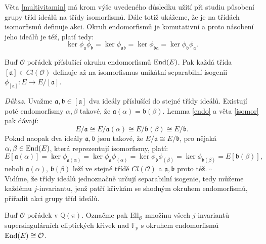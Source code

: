 \documentclass[12pt]{report}
\begin{document}
Věta \ref{multivitamin} má krom výše uvedeného důsledku užití při studiu působení grupy tříd ideálů na třídy isomorfismů. Dále totiž ukážeme, že je na třídách isomorfismů definuje akci. Okruh endomorfismů je komutativní a proto násobení jeho ideálů je též, platí tedy:
\begin{equation*}
\ker \phi_{\mathfrak{a}} \phi_{\mathfrak{b}} = \ker \phi_{\mathfrak{ab}} =\ker \phi_{\mathfrak{ba}} = \ker \phi_{\mathfrak{b}} \phi_{\mathfrak{a}}.
\end{equation*}


\begin{veta}\label{idealiso}
Buď $\mathcal{O}$ pořádek příslušící okruhu endomorfismů $\operatorname{End}(E)$. Pak každá třída $[\mathfrak{a}] \in Cl(\mathcal{O})$ definuje až na isomorfismus unikátní separabilní isogenii $\phi_{[\mathfrak{a}]} : E \longrightarrow E/[\mathfrak{a}]$.
\end{veta}
\noindent \textit{Důkaz.} Uvažme $\mathfrak{a},\mathfrak{b} \in [\mathfrak{a}]$ dva ideály příslušící do stejné třídy ideálů. Existují poté endomorfismy $\alpha,\beta$ takové, že $\mathfrak{a}(\alpha) =  \mathfrak{b}(\beta)$. Lemma \ref{endo} a věta \ref{isomor} pak dávají:
\begin{equation*}
E/\mathfrak{a} \cong E/\mathfrak{a}(\alpha)\cong E/\mathfrak{b}(\beta) \cong E/\mathfrak{b}.
\end{equation*}
Pokud naopak dva ideály $\mathfrak{a},\mathfrak{b}$ jsou takové, že $E/\mathfrak{a} \cong E/\mathfrak{b}$, pro nějaká $\alpha,\beta \in \operatorname{End}(E)$, která reprezentují isomorfismy, platí:
\begin{equation*}
E[\mathfrak{a}(\alpha)] = \ker \phi_{\mathfrak{a}(\alpha)} =  \ker \phi_{\mathfrak{a}} \phi_{(\alpha)} = \ker  \phi_{\mathfrak{b}} \phi_{(\beta)} = \ker \phi_{\mathfrak{b} (\beta)} = E[\mathfrak{b}(\beta)],
\end{equation*}
neboli $\mathfrak{a}(\alpha)$, $\mathfrak{b}(\beta)$ leží ve stejné třídě $Cl(\mathcal{O})$ a $\mathfrak{a}, \mathfrak{b}$ proto též.
\hfill $\square$\\

Vidíme, že třídy ideálů jednoznačně určují separabilní isogenie, tedy můžeme každému $j$-invariantu, jenž patří křivkám se shodným okruhem endomorfismů, přiřadit akci grupy tříd ideálů.

\begin{definice}
Buď $\mathcal{O}$ pořádek v $\mathbb{Q}(\pi)$. Označme pak $\mathrm{Ell}_{\mathcal{O}}$ množinu všech $j$-invariantů supersingulárních eliptických křivek nad $\mathbb{F}_p$ s okruhem endomorfismů $\operatorname{End}(E) \cong \mathcal{O}$.  
\end{definice}
\end{document}

